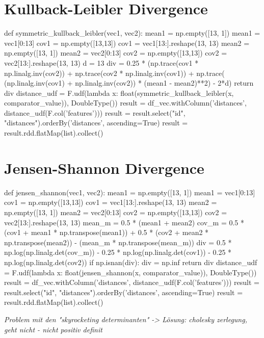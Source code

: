 \section{Kullback-Leibler Divergence}

\begin{pythonCode}
def symmetric_kullback_leibler(vec1, vec2):
    mean1 = np.empty([13, 1])
    mean1 = vec1[0:13]
    cov1 = np.empty([13,13])
    cov1 = vec1[13:].reshape(13, 13)
    mean2 = np.empty([13, 1])
    mean2 = vec2[0:13]
    cov2 = np.empty([13,13])
    cov2 = vec2[13:].reshape(13, 13)
    d = 13
    div = 0.25 * (np.trace(cov1 * np.linalg.inv(cov2)) + np.trace(cov2 * np.linalg.inv(cov1)) + np.trace( (np.linalg.inv(cov1) + np.linalg.inv(cov2)) * (mean1 - mean2)**2) - 2*d)
    return div
distance_udf = F.udf(lambda x: float(symmetric_kullback_leibler(x, comparator_value)), DoubleType())
result = df_vec.withColumn('distances', distance_udf(F.col('features')))
result = result.select("id", "distances").orderBy('distances', ascending=True)
result = result.rdd.flatMap(list).collect()
\end{pythonCode}


\section{Jensen-Shannon Divergence}

\begin{pythonCode}
def jensen_shannon(vec1, vec2):
    mean1 = np.empty([13, 1])
    mean1 = vec1[0:13]
    cov1 = np.empty([13,13])
    cov1 = vec1[13:].reshape(13, 13)
    mean2 = np.empty([13, 1])
    mean2 = vec2[0:13]
    cov2 = np.empty([13,13])
    cov2 = vec2[13:].reshape(13, 13)
    mean_m = 0.5 * (mean1 + mean2)
    cov_m = 0.5 * (cov1 + mean1 * np.transpose(mean1)) + 0.5 * (cov2 + mean2 * np.transpose(mean2)) - (mean_m * np.transpose(mean_m))
    div = 0.5 * np.log(np.linalg.det(cov_m)) - 0.25 * np.log(np.linalg.det(cov1)) - 0.25 * np.log(np.linalg.det(cov2))  
    if np.isnan(div):
        div = np.inf
    return div
distance_udf = F.udf(lambda x: float(jensen_shannon(x, comparator_value)), DoubleType())
result = df_vec.withColumn('distances', distance_udf(F.col('features')))
result = result.select("id", "distances").orderBy('distances', ascending=True)
result = result.rdd.flatMap(list).collect()

\end{pythonCode}

\textit{Problem mit den "skyrocketing determinanten" -> Lösung: cholesky zerlegung, geht nicht - nicht positiv definit}\cite[p.45]{schnitzer1}


